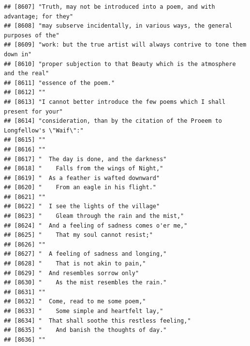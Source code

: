 \documentclass{article}\usepackage[]{graphicx}\usepackage[]{color}
\makeatletter
\newenvironment{kframe}{%
 \def\at@end@of@kframe{}%
 \ifinner\ifhmode%
  \def\at@end@of@kframe{\end{minipage}}%
  \begin{minipage}{\columnwidth}%
 \fi\fi%
 \def\FrameCommand##1{\hskip\@totalleftmargin \hskip-\fboxsep
 \colorbox{shadecolor}{##1}\hskip-\fboxsep
     \hskip-\linewidth \hskip-\@totalleftmargin \hskip\columnwidth}%
 \MakeFramed {\advance\hsize-\width
   \@totalleftmargin\z@ \linewidth\hsize
   \@setminipage}}%
 {\par\unskip\endMakeFramed%
 \at@end@of@kframe}
\newenvironment{knitrout}{}{} %
\makeatother
\begin{document}
\begin{knitrout}
\begin{kframe}
\begin{verbatim}
## [8607] "Truth, may not be introduced into a poem, and with advantage; for they"      
## [8608] "may subserve incidentally, in various ways, the general purposes of the"     
## [8609] "work: but the true artist will always contrive to tone them down in"         
## [8610] "proper subjection to that Beauty which is the atmosphere and the real"       
## [8611] "essence of the poem."                                                        
## [8612] ""                                                                            
## [8613] "I cannot better introduce the few poems which I shall present for your"      
## [8614] "consideration, than by the citation of the Proeem to Longfellow's \"Waif\":" 
## [8615] ""                                                                            
## [8616] ""                                                                            
## [8617] "  The day is done, and the darkness"                                         
## [8618] "    Falls from the wings of Night,"                                          
## [8619] "  As a feather is wafted downward"                                           
## [8620] "    From an eagle in his flight."                                            
## [8621] ""                                                                            
## [8622] "  I see the lights of the village"                                           
## [8623] "    Gleam through the rain and the mist,"                                    
## [8624] "  And a feeling of sadness comes o'er me,"                                   
## [8625] "    That my soul cannot resist;"                                             
## [8626] ""                                                                            
## [8627] "  A feeling of sadness and longing,"                                         
## [8628] "    That is not akin to pain,"                                               
## [8629] "  And resembles sorrow only"                                                 
## [8630] "    As the mist resembles the rain."                                         
## [8631] ""                                                                            
## [8632] "  Come, read to me some poem,"                                               
## [8633] "    Some simple and heartfelt lay,"                                          
## [8634] "  That shall soothe this restless feeling,"                                  
## [8635] "    And banish the thoughts of day."                                         
## [8636] ""                                                                            

\end{verbatim}
\end{kframe}
\end{knitrout}
\end{document}
